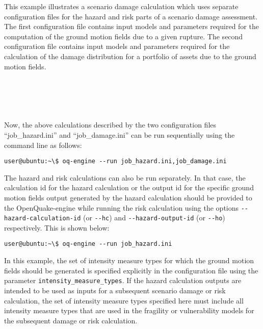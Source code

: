 This example illustrates a scenario damage calculation which uses separate
configuration files for the hazard and risk parts of a scenario damage
assessment. The first configuration file contains input models and parameters
required for the computation of the ground motion fields due to a given
rupture. The second configuration file contains input models and parameters
required for the calculation of the damage distribution for a portfolio of
assets due to the ground motion fields.

\inputminted[firstline=1,firstnumber=1,fontsize=\footnotesize,frame=single,linenos,bgcolor=lightgray,label=job\_hazard.ini]{ini}{oqum/risk/verbatim/config_scenario_hazard.ini}\\

\inputminted[firstline=1,firstnumber=1,fontsize=\footnotesize,frame=single,linenos,bgcolor=lightgray,label=job\_damage.ini]{ini}{oqum/risk/verbatim/config_scenario_damage.ini}\\

Now, the above calculations described by the two configuration files
``job\_hazard.ini'' and ``job\_damage.ini'' can be run sequentially using the
command line as follows:

\begin{Verbatim}[frame=single, commandchars=\\\{\}, samepage=true]
user@ubuntu:~\$ oq-engine --run job_hazard.ini,job_damage.ini
\end{Verbatim}

The hazard and risk calculations can also be run separately. In that case, the
calculation id for the hazard calculation or the output id for the specific
ground motion fields output generated by the hazard calculation should be
provided to the OpenQuake-engine while running the risk calculation using the
options \Verb+--hazard-calculation-id+ (or \Verb+--hc+) and 
\Verb+--hazard-output-id+ (or \Verb+--ho+) respectively. This is shown below:

\begin{Verbatim}[frame=single, commandchars=\\\{\}, samepage=true]
user@ubuntu:~\$ oq-engine --run job_hazard.ini
\end{Verbatim}

In this example, the set of intensity measure types for which the ground
motion fields should be generated is specified explicitly in the configuration
file using the parameter \Verb+intensity_measure_types+. If the hazard
calculation outputs are intended to be used as inputs for a subsequent
scenario damage or risk calculation, the set of intensity measure types
specified here must include all intensity measure types that are used in the
fragility or vulnerability models for the subsequent damage or risk
calculation.

